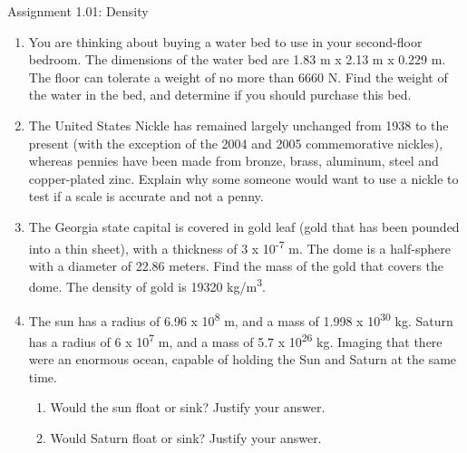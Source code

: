 \documentclass[letterpaper, 12pt]{article}
\begin{document}
	

	
\begin{center}Assignment 1.01: Density
\end{center}

\begin{enumerate}




	\item You are thinking about buying a water bed to use in your second-floor bedroom.  The dimensions of the water bed are 1.83 m x 2.13 m x 0.229 m.  The floor can tolerate a weight of no more than 6660 N. Find the weight of the water in the bed, and determine if you should purchase this bed.
	\vspace{1in}
		
	\item The United States Nickle has remained largely unchanged from 1938 to the present (with the exception of the 2004 and 2005 commemorative nickles), whereas pennies have been made from bronze, brass, aluminum, steel and copper-plated zinc.  Explain why some someone would want to use a nickle to test if a scale is accurate and not a penny.  
	\vspace{1in}
	
	\item The Georgia state capital is covered in gold leaf (gold that has been pounded into a thin sheet), with a thickness of 3 x 10\textsuperscript{-7} m.  The dome is a half-sphere with a diameter of 22.86 meters.  Find the mass of the gold that covers the dome.  The density of gold is 19320 kg/m\textsuperscript{3}.  
	\vspace{1in}
		
	\item The sun has a radius of 6.96 x 10\textsuperscript{8} m, and a mass of 1.998 x 10\textsuperscript{30} kg.  Saturn has a radius of 6 x 10\textsuperscript{7} m, and a mass of 5.7 x 10\textsuperscript{26} kg.  Imaging that there were an enormous ocean, capable of holding the Sun and Saturn at the same time.  
	\begin{enumerate} 
		\item Would the sun float or sink?  Justify your answer.
		\vspace{0.5in}
		\item Would Saturn float or sink?  Justify your answer.
	\end{enumerate}
	\vspace{1in}
	

\end{enumerate}
\end{document}
